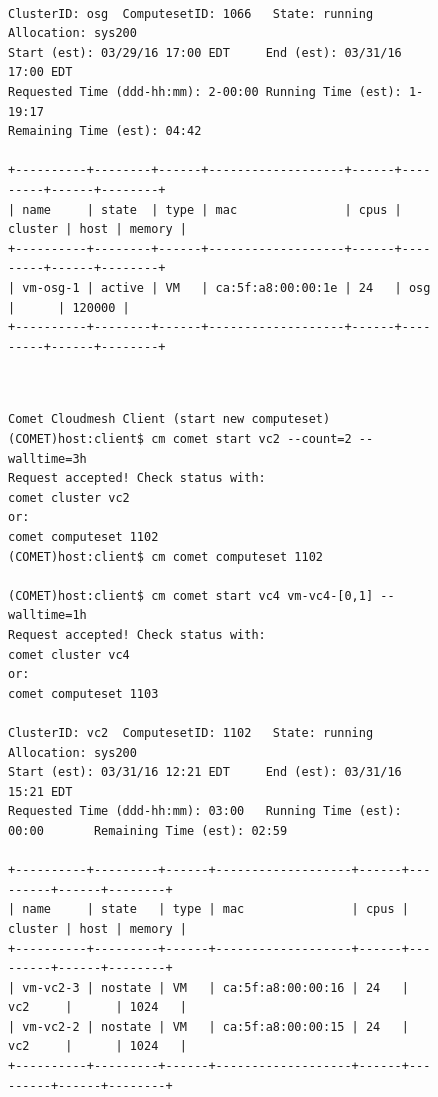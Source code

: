 \begin{figure}[htb] 
\begin{small}
\begin{verbatim}

ClusterID: osg	ComputesetID: 1066	 State: running		Allocation: sys200
Start (est): 03/29/16 17:00 EDT		End (est): 03/31/16 17:00 EDT
Requested Time (ddd-hh:mm): 2-00:00	Running Time (est): 1-19:17
Remaining Time (est): 04:42

+----------+--------+------+-------------------+------+---------+------+--------+
| name     | state  | type | mac               | cpus | cluster | host | memory |
+----------+--------+------+-------------------+------+---------+------+--------+
| vm-osg-1 | active | VM   | ca:5f:a8:00:00:1e | 24   | osg     |      | 120000 |
+----------+--------+------+-------------------+------+---------+------+--------+
\end{verbatim}
\end{small}
\end{figure}

\begin{figure}[htb] 
\begin{small}
\begin{verbatim}


Comet Cloudmesh Client (start new computeset)
(COMET)host:client$ cm comet start vc2 --count=2 --walltime=3h
Request accepted! Check status with:
comet cluster vc2
or:
comet computeset 1102
(COMET)host:client$ cm comet computeset 1102

(COMET)host:client$ cm comet start vc4 vm-vc4-[0,1] --walltime=1h
Request accepted! Check status with:
comet cluster vc4
or:
comet computeset 1103

ClusterID: vc2	ComputesetID: 1102	 State: running		Allocation: sys200
Start (est): 03/31/16 12:21 EDT		End (est): 03/31/16 15:21 EDT
Requested Time (ddd-hh:mm): 03:00	Running Time (est): 00:00		Remaining Time (est): 02:59

+----------+---------+------+-------------------+------+---------+------+--------+
| name     | state   | type | mac               | cpus | cluster | host | memory |
+----------+---------+------+-------------------+------+---------+------+--------+
| vm-vc2-3 | nostate | VM   | ca:5f:a8:00:00:16 | 24   | vc2     |      | 1024   |
| vm-vc2-2 | nostate | VM   | ca:5f:a8:00:00:15 | 24   | vc2     |      | 1024   |
+----------+---------+------+-------------------+------+---------+------+--------+
\end{verbatim}
\end{small}
\end{figure}

